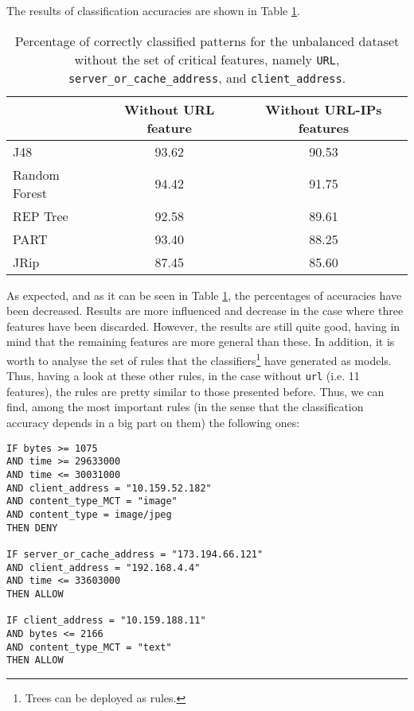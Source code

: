 \documentclass{llncs}
\begin{document}
The results of classification accuracies are shown in Table \ref{tab_rules_study_classification}.
 
\begin{table}[htpb]
\centering
 \caption{\label{tab_rules_study_classification} Percentage of correctly classified patterns for the unbalanced dataset without the set of critical features, namely \texttt{URL}, \texttt{server\_or\_cache\_address}, and \texttt{client\_address}.} 
{\small
\begin{tabular}{|l|c|c|}
\cline{2-3}
\multicolumn{1}{l|}{} & Without URL feature & Without URL-IPs features\\
\hline
J48 & 93.62 & 90.53 \\
\cline{1-1}
Random Forest & 94.42 & 91.75 \\
\cline{1-1}
REP Tree & 92.58 & 89.61 \\
\cline{1-1}
PART & 93.40 & 88.25 \\
\cline{1-1}
JRip & 87.45 & 85.60 \\
\hline
\end{tabular}
}
\end{table}

As expected, and as it can be seen in Table \ref{tab_rules_study_classification}, the percentages of accuracies have been decreased. Results are more influenced and decrease  in the case where three features have been discarded. However, the results are still quite good, having in mind that the remaining features are more general than these. In addition, it is worth to analyse the set of rules that the classifiers\footnote{Trees can be deployed as rules.} have generated as models. Thus, having a look at these other rules, in the case without \texttt{url} (i.e. 11 features), the rules are pretty similar to those presented before. Thus, we can find, among the most important rules (in the sense that the classification accuracy depends in a big part on them) the following ones:

\begin{small}
\begin{verbatim}
IF bytes >= 1075
AND time >= 29633000
AND time <= 30031000
AND client_address = "10.159.52.182"
AND content_type_MCT = "image"
AND content_type = image/jpeg
THEN DENY

IF server_or_cache_address = "173.194.66.121"
AND client_address = "192.168.4.4"
AND time <= 33603000
THEN ALLOW

IF client_address = "10.159.188.11"
AND bytes <= 2166
AND content_type_MCT = "text"
THEN ALLOW
\end{verbatim}
\end{small}
\end{document}
